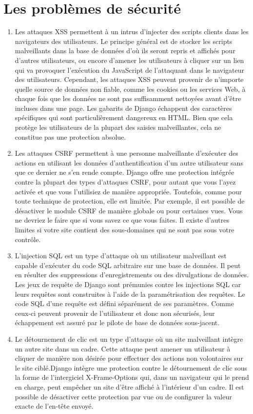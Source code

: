 \documentclass[11pt,a4paper]{article}
\begin{document}
\section{Les problèmes de sécurité}
\begin{enumerate}
	\item Les attaques XSS permettent à un intrus d’injecter des scripts clients dans les navigateurs des utilisateurs. Le principe général est de stocker les scripts malveillants dans la base de données d’où ils seront repris et affichés pour d’autres utilisateurs, ou encore d’amener les utilisateurs à cliquer sur un lien qui va provoquer l’exécution du JavaScript de l’attaquant dans le navigateur des utilisateurs. Cependant, les attaques XSS peuvent provenir de n’importe quelle source de données non fiable, comme les cookies ou les services Web, à chaque fois que les données ne sont pas suffisamment nettoyées avant d’être incluses dans une page.
	Les gabarits de Django échappent des caractères spécifiques qui sont particulièrement dangereux en HTML. Bien que cela protège les utilisateurs de la plupart des saisies malveillantes, cela ne constitue pas une protection absolue. 
	\item Les attaques CSRF permettent à une personne malveillante d’exécuter des actions en utilisant les données d’authentification d’un autre utilisateur sans que ce dernier ne s’en rende compte.
	Django offre une protection intégrée contre la plupart des types d’attaques CSRF, pour autant que vous l’ayez activée et que vous l’utilisiez de manière appropriée. Toutefois, comme pour toute technique de protection, elle est limitée. Par exemple, il est possible de désactiver le module CSRF de manière globale ou pour certaines vues. Vous ne devriez le faire que si vous savez ce que vous faites. Il existe d’autres limites si votre site contient des sous-domaines qui ne sont pas sous votre contrôle.
	\item L’injection SQL est un type d’attaque où un utilisateur malveillant est capable d’exécuter du code SQL arbitraire sur une base de données. Il peut en résulter des suppressions d’enregistrements ou des divulgations de données.
	Les jeux de requête de Django sont prémunies contre les injections SQL car leurs requêtes sont construites à l’aide de la paramétrisation des requêtes. Le code SQL d’une requête est défini séparément de ses paramètres. Comme ceux-ci peuvent provenir de l’utilisateur et donc non sécurisés, leur échappement est assuré par le pilote de base de données sous-jacent.
	\item Le détournement de clic est un type d’attaque où un site malveillant intègre un autre site dans un cadre. Cette attaque peut amener un utilisateur à cliquer de manière non désirée pour effectuer des actions non volontaires sur le site ciblé.Django intègre une protection contre le détournement de clic sous la forme de l'intergiciel X-Frame-Options qui, dans un navigateur qui le prend en charge, peut empêcher un site d’être affiché à l’intérieur d’un cadre. Il est possible de désactiver cette protection par vue ou de configurer la valeur exacte de l’en-tête envoyé.

\end{enumerate}
\end{document}
